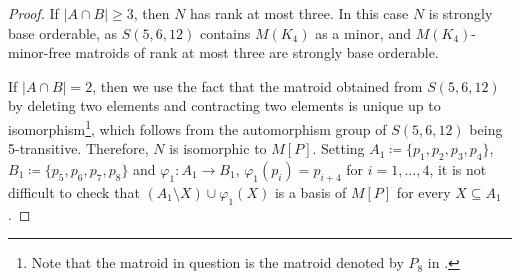 \documentclass[11pt,a4paper]{article}
\theoremstyle{plain}
\theoremstyle{definition}
\begin{document}
\begin{proof}
If $|A \cap B| \ge 3$, then $N$ has rank at most three. In this case $N$ is strongly base orderable, as $S(5,6,12)$ contains $M(K_4)$ as a minor, and $M(K_4)$-minor-free matroids of rank at most three are strongly base orderable.

If $|A \cap B| = 2$, then we use the fact that the matroid obtained from $S(5,6,12)$ by deleting two elements and contracting two elements is unique up to isomorphism\footnote{Note that the matroid in question is the matroid denoted by $P_8$ in \cite{oxley2011matroid}.}, which follows from the automorphism group of $S(5,6,12)$ being 5-transitive.  Therefore, $N$ is isomorphic to $M[P]$. Setting $A_1 \coloneqq \{p_1, p_2, p_3, p_4\}$, $B_1 \coloneqq \{p_5, p_6, p_7, p_8\}$ and $\varphi_1\colon A_1 \to B_1$, $\varphi_1(p_i) = p_{i+4}$ for $i=1,\dots,4$, it is not difficult to check that $(A_1 \setminus X) \cup \varphi_1(X)$ is a basis of $M[P]$ for every $X \subseteq A_1$.


\end{proof}
\end{document}
